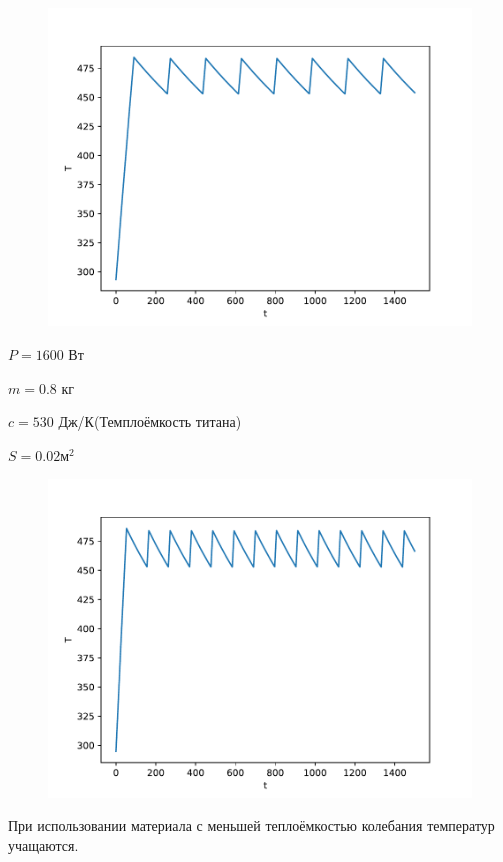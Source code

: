 \documentclass[a4paper, 14pt]{extarticle}
\begin{document}
			\begin{figure}[H]
				\centering
				\includegraphics[width = \linewidth]{fig5.pdf}
				\caption[.] {}
			\end{figure}
			\pagebreak
			
			$P = 1600$ Вт
			
			$m = 0.8$ кг
			
			$c = 530$ Дж/К(Темплоёмкость титана)
			
			$S = 0.02 \text{м}^2$
			
			\begin{figure}[H]
				\centering
				\includegraphics[width = \linewidth]{fig6.pdf}
				\caption[.] {}
			\end{figure}
			При использовании материала с меньшей теплоёмкостью колебания температур учащаются.
			\pagebreak
			
\end{document}
